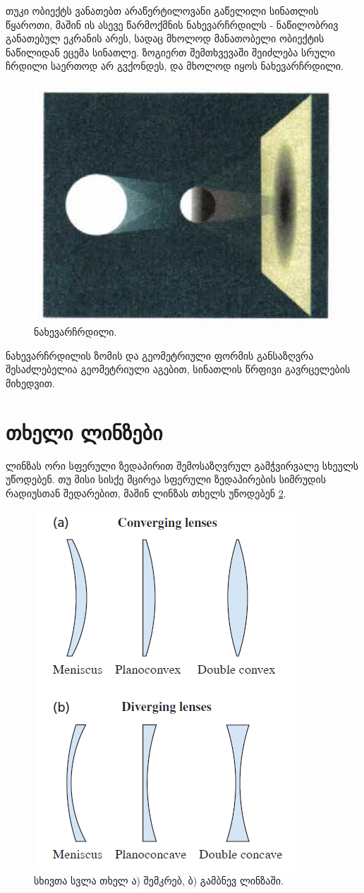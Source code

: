 \documentclass{book}
\begin{document}
თუკი ობიექტს ვანათებთ არაწერტილოვანი გაწელილი სინათლის წყაროთი, მაშინ ის ასევე წარმოქმნის ნახევარჩრდილს - ნაწილობრივ განათებულ ეკრანის არეს, სადაც მხოლოდ მანათობელი ობიექტის ნაწილიდან ეცემა სინათლე. ზოგიერთ შემთხვევაში შეიძლება სრული ჩრდილი საერთოდ არ გვქონდეს, და მხოლოდ იყოს ნახევარჩრდილი.
		\begin{figure}[H]
		   \centering
           \includegraphics[width=0.3\columnwidth]{figures/penumbra}
           \caption{ნახევარჩრდილი.}
           \label{fig:penumbra}
        \end{figure}
        
ნახევარჩრდილის ზომის და გეომეტრიული ფორმის განსაზღვრა შესაძლებელია გეომეტრიული აგებით, სინათლის წრფივი გავრცელების მიხედვით.

\section{თხელი ლინზები} ლინზას ორი სფერული ზედაპირით შემოსაზღვრულ გამჭვირვალე სხეულს უწოდებენ. თუ მისი სისქე მცირეა სფერული ზედაპირების სიმრუდის რადიუსთან შედარებით, მაშინ ლინზას თხელს უწოდებენ \ref{fig:thin_lenses}.
		\begin{figure}[h]
		   \centering
           \includegraphics[width=0.4\columnwidth]{figures/thin_lenses}
           \caption{სხივთა სვლა თხელ ა) შემკრებ, ბ) გამბნევ ლინზაში.}
           \label{fig:thin_lenses}
        \end{figure}
\end{document}

